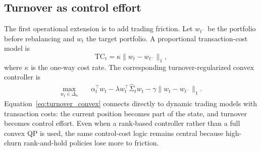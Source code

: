\documentclass[11pt,a4paper]{article}
\begin{document}
\subsection{Turnover as control effort}
The first operational extension is to add trading friction. Let $w_{t^-}$ be the portfolio before rebalancing and $w_t$ the target portfolio. A proportional transaction-cost model is
\begin{equation}
\text{TC}_t = \kappa \lVert w_t-w_{t^-}\rVert_1,
\end{equation}
where $\kappa$ is the one-way cost rate. The corresponding turnover-regularized convex controller is
\begin{equation}
\begin{aligned}
\max_{w_t\in\Delta_n}\quad & \alpha_t^\top w_t - \lambda w_t^\top\widehat{\Sigma}_t w_t - \gamma\lVert w_t-w_{t^-}\rVert_1.
\end{aligned}
\label{eq:turnover_convex}
\end{equation}
Equation~\eqref{eq:turnover_convex} connects directly to dynamic trading models with transaction costs: the current position becomes part of the state, and turnover becomes control effort. Even when a rank-based controller rather than a full convex QP is used, the same control-cost logic remains central because high-churn rank-and-hold policies lose more to friction.
\end{document}
